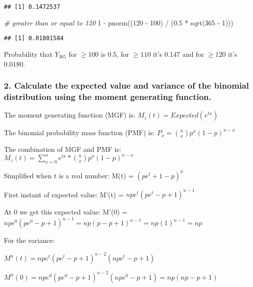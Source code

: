 \documentclass[
]{article}
\newenvironment{Shaded}{\begin{snugshade}}{\end{snugshade}}
\newcommand{\CommentTok}[1]{\textcolor[rgb]{0.56,0.35,0.01}{\textit{#1}}}
\newcommand{\DecValTok}[1]{\textcolor[rgb]{0.00,0.00,0.81}{#1}}
\newcommand{\FloatTok}[1]{\textcolor[rgb]{0.00,0.00,0.81}{#1}}
\newcommand{\FunctionTok}[1]{\textcolor[rgb]{0.00,0.00,0.00}{#1}}
\newcommand{\NormalTok}[1]{#1}
\newcommand{\SpecialCharTok}[1]{\textcolor[rgb]{0.00,0.00,0.00}{#1}}
\begin{document}
\begin{verbatim}
## [1] 0.1472537
\end{verbatim}

\begin{Shaded}
\begin{Highlighting}[]
\CommentTok{\# greater than or equal to 120}
\DecValTok{1} \SpecialCharTok{{-}} \FunctionTok{pnorm}\NormalTok{((}\DecValTok{120} \SpecialCharTok{{-}} \DecValTok{100}\NormalTok{) }\SpecialCharTok{/}\NormalTok{ (}\FloatTok{0.5} \SpecialCharTok{*} \FunctionTok{sqrt}\NormalTok{(}\DecValTok{365} \SpecialCharTok{{-}} \DecValTok{1}\NormalTok{)))}
\end{Highlighting}
\end{Shaded}

\begin{verbatim}
## [1] 0.01801584
\end{verbatim}

Probability that \(Y_365\) for \(\ge 100\) is 0.5, for \(\ge 110\) it's
0.147 and for \(\ge 120\) it's 0.0180.

\hypertarget{calculate-the-expected-value-and-variance-of-the-binomial-distribution-using-the-moment-generating-function.}{%
\subsubsection{2. Calculate the expected value and variance of the
binomial distribution using the moment generating
function.}\label{calculate-the-expected-value-and-variance-of-the-binomial-distribution-using-the-moment-generating-function.}}

The moment generating function (MGF) is: \(M_z (t) = Expected(e^{tx})\)

The binomial probability mass function (PMF) is:
\(P_x = \binom{n}{x}p^x (1 - p)^{n - x}\)

The combination of MGF and PMF is:
\(M_z (t) = \sum_{x = 0}^{n} e^{tx} * \binom{n}{x}p^x (1 - p)^{n - x}\)

Simplified when t is a real number: M(t) = \((pe^t + 1 - p)^n\)

First instant of expected value: M'(t) = \(npe^t(pe^t - p + 1)^{n-1}\)

At 0 we get this expected value: M'(0) =
\(npe^0(pe^0 - p + 1)^{n-1} = np(p - p + 1)^{n - 1} = np(1)^{n - 1} = np\)

For the variance:

\(M^n(t) = npe^t(pe^t - p + 1)^{n-2}(npe^t -p +1)\)

\(M^n(0) = npe^0(pe^0 - p + 1)^{n-2}(npe^0 -p +1) = np(np - p + 1)\)
\end{document}
